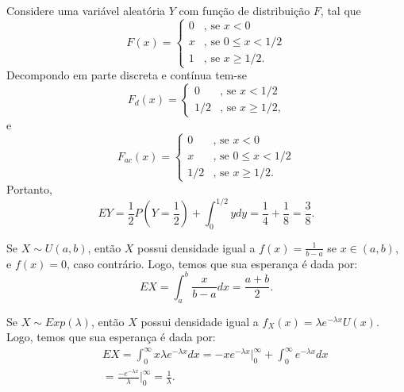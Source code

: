 %
\begin{frame}
\begin{exem}
%
%
Considere uma variável aleatória $Y$ com função de distribuição $F$, tal que
$$F(x)=
\left\{
\begin{array}{ll}
0 & \mbox{, se $x<0$} \\
x & \mbox{, se $0\leq x<1/2$} \\
1 & \mbox{, se $x\geq 1/2$.}
\end{array}
\right.$$
%
%
%
%
Decompondo em parte discreta e contínua tem-se
$$F_d(x)=
\left\{
\begin{array}{ll}
0 & \mbox{, se $x<1/2$} \\
1/2 & \mbox{, se $x\geq 1/2$,}
\end{array}
\right.$$
e
$$F_{ac}(x)=
\left\{
\begin{array}{ll}
0 & \mbox{, se $x<0$} \\
x & \mbox{, se $0\leq x<1/2$} \\
1/2 & \mbox{, se $x\geq 1/2$.}
\end{array}
\right.$$
Portanto,
$$EY=\frac{1}{2}P(Y=\frac{1}{2})+\int_{0}^{1/2}ydy=\frac{1}{4}+\frac{1}{8}=\frac{3}{8}.$$
\end{exem}
%
\end{frame}
%
\begin{frame}
\begin{exem}[Uniforme]
%
Se $X\sim U(a,b)$, então $X$ possui densidade igual a $f(x)=\frac{1}{b-a}$ se $x\in(a,b)$, e $f(x)=0$, caso contrário. Logo, temos
que sua esperança é dada por:
$$EX=\int_{a}^{b}\frac{x}{b-a}dx=\frac{a+b}{2}.$$
%
\end{exem}
%
\begin{exem}[Exponencial]
%
Se $X\sim Exp(\lambda)$, então $X$ possui densidade igual a $f_X(x)=\lambda e^{-\lambda x}U(x)$. Logo, temos
que sua esperança é dada por:
\begin{eqnarray}
& & EX=\int_{0}^{\infty}x\lambda e^{-\lambda x}dx=-xe^{-\lambda x}|_{0}^{\infty}+\int_{0}^{\infty}e^{-\lambda x}dx \nonumber \\
& &  =\frac{-e^{-\lambda x}}{\lambda}|_{0}^{\infty}=\frac{1}{\lambda}.\nonumber
\end{eqnarray}

\end{exem}
\end{frame}
